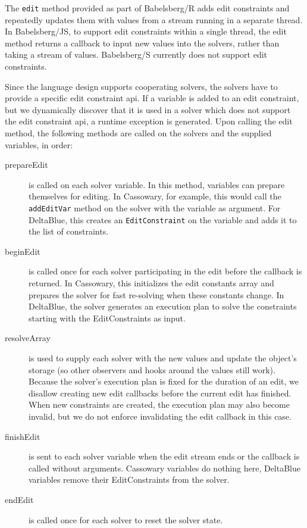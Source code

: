\documentclass[numbers]{sigplanconf}
\newcommand{\ac}[1]{\gls{#1}}
\begin{document}
The \lstinline{edit} method provided as part of Babelsberg/R adds edit
constraints and repeatedly updates them with values from a stream running in a
separate thread. In Babelsberg/JS, to support edit constraints within a single
thread, the edit method returns a callback to input new values into the solvers,
rather than taking a stream of values. Babelsberg/S currently does not support
edit constraints.

Since the language design supports cooperating solvers, the solvers have to
provide a specific edit constraint \ac{api}\@. If a variable is added to an edit
constraint, but we dynamically discover that it is used in a solver which does
not support the edit constraint \ac{api}, a runtime exception is generated.
Upon calling the edit method, the following methods are called on the solvers
and the supplied variables, in order:
\begin{description}
\item[prepareEdit] is called on each solver variable. In this method, variables
  can prepare themselves for editing. In Cassowary, for example, this would call
  the \lstinline{addEditVar} method on the solver with the variable as
  argument. For DeltaBlue, this creates an \lstinline{EditConstraint} on the
  variable and adds it to the list of constraints.
\item[beginEdit] is called once for each solver participating in the edit before
  the callback is returned. In Cassowary, this initializes the edit constants
  array and prepares the solver for fast re-solving when these constants
  change. In DeltaBlue, the solver generates an execution plan to solve the
  constraints starting with the EditConstraints as input.
\item[resolveArray] is used to supply each solver with the new values and update
  the object's storage (so other observers and hooks around the values still
  work). Because the solver's execution plan is fixed for the duration of an
  edit, we disallow creating new edit callbacks before the current edit has
  finished. When new constraints are created, the execution plan may also become
  invalid, but we do not enforce invalidating the edit callback in this case.
\item[finishEdit] is sent to each solver variable when the edit stream ends or
  the callback is called without arguments. Cassowary variables do nothing here,
  DeltaBlue variables remove their EditConstraints from the solver.
\item[endEdit] is called once for each solver to reset the solver state.
\end{description}
\end{document}
